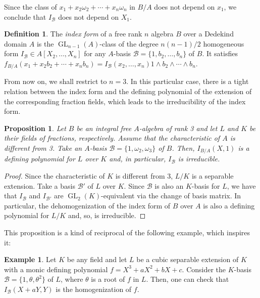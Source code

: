 \documentclass[oneside]{amsart}
\DeclareMathOperator{\gl}{GL}
\newtheorem{proposition}[X]{Proposition}
\theoremstyle{definition}
\newtheorem{definition}[X]{Definition}
\newtheorem{example}[X]{Example}
\begin{document}
Since the class of $x_1 + x_2\omega_2 + \cdots + x_n\omega_n$ in $B/A$ does not depend on $x_1$, we conclude that $I_{\mathcal{B}}$ does not depend on $X_1$.

\begin{definition}
    The \textit{index form} of a free rank $n$ algebra $B$ over a Dedekind domain $A$ is the $\gl_{n-1}(A)$-class of the degree $n(n-1)/2$ homogeneous form $I_{\mathcal{B}}\in A[X_2,\dots, X_n]$ for any $A$-basis $\mathcal{B}=\{1,b_2,\dots, b_n\}$ of $B$.
It satisfies
$ 
f_{B/A}(x_1 + x_2b_2 + \cdots + x_n b_n)=I_{\mathcal {B}}(x_2, \dots, x_n) 1\wedge b_2 \wedge\cdots\wedge b_n.
$
\end{definition}

From now on, we shall restrict to $n = 3$. In this particular case, there is a tight relation between the index form and the defining polynomial of the extension of the corresponding fraction fields, which leads to the irreducibility of the index form.

\begin{proposition}
    \label{proposition: irreducibility of index form}
    Let $B$ be an integral free $A$-algebra of rank 3 and let $L$ and $K$ be their fields of fractions, respectively. Assume that the characteristic of $A$ is different from 3. Take an $A$-basis $\mathcal{B} = \{1,\omega_2,\omega_3\}$ of $B$. Then, $I_{B/A}(X,1)$ is a defining polynomial for $L$ over $K$ and, in particular, $I_{\mathcal{B}}$ is irreducible.
\end{proposition}
\begin{proof}
    Since the characteristic of $K$ is different from 3, $L/K$ is a separable extension. Take a basis $\mathcal{B}'$ of $L$ over $K$. Since $\mathcal{B}$ is also an $K$-basis for $L$, we have that $I_{\mathcal{B}}$ and $I_{\mathcal{B}'}$ are $\gl_2(K)$-equivalent via the change of basis matrix. In particular, the dehomogenization of the index form of $B$ over $A$ is also a defining polynomial for $L/K$ and, so, is irreducible.
\end{proof}

This proposition is a kind of reciprocal of the following example, which inspires it: 

\begin{example}
    Let $K$ be any field and let $L$ be a cubic separable extension of $K$ with a monic defining polynomial $f = X^3 + aX^2 + bX + c$. Consider the $K$-basis $\mathcal{B} = \{1,\theta,\theta^2\}$ of $L$, where $\theta$ is a root of $f$ in $L$. Then, one can check that $I_{\mathcal{B}}(X + aY,Y)$ is the homogenization of $f$.
\end{example}
\end{document}
